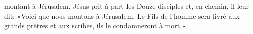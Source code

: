 \encetemps montant à Jérusalem,
	Jésus prit à part les Douze disciples et, en chemin, il leur dit:
	«Voici que nous montons à Jérusalem.
Le Fils de l’homme sera livré aux grands prêtres et aux scribes,
	ils le condamneront à mort.»
